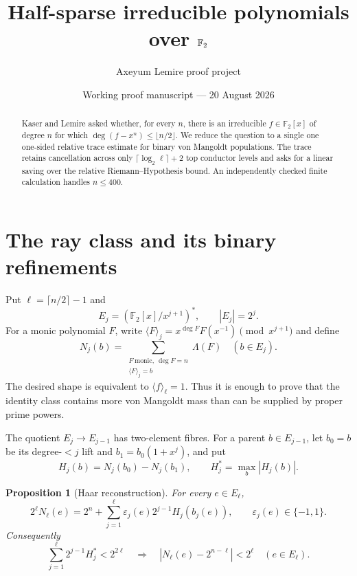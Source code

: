 \documentclass[10pt]{article}
\title{Half-sparse irreducible polynomials over $\F_2$}
\author{Axeyum Lemire proof project}
\date{Working proof manuscript --- 20 August 2026}
\newtheorem{proposition}[theorem]{Proposition}
\newcommand{\F}{\mathbb F}
\begin{document}
\maketitle
\vspace{-1.2em}
\begin{center}
\end{center}

\begin{abstract}
Kaser and Lemire asked whether, for every $n$, there is an irreducible
$f\in\F_2[x]$ of degree $n$ for which
$\deg(f-x^n)\leq\lfloor n/2\rfloor$.  We reduce the question to a single
one one-sided relative trace estimate for binary von Mangoldt populations.
The trace retains cancellation across only $\lceil\log_2\ell\rceil+2$ top
conductor levels and asks for a linear saving over the relative
Riemann--Hypothesis bound.  An independently checked finite calculation
handles $n\leq400$.
\end{abstract}

\section{The ray class and its binary refinements}

Put $\ell=\lceil n/2\rceil-1$ and
\[
 E_j=(\F_2[x]/x^{j+1})^*,\qquad |E_j|=2^j.
\]
For a monic polynomial $F$, write
$\langle F\rangle_j=x^{\deg F}F(x^{-1})\pmod{x^{j+1}}$ and define
\[
 N_j(b)=\sum_{\substack{F\ \mathrm{monic},\ \deg F=n\\
                         \langle F\rangle_j=b}}\Lambda(F)
 \quad(b\in E_j).
\]
The desired shape is equivalent to $\langle f\rangle_\ell=1$.  Thus it is
enough to prove that the identity class contains more von Mangoldt mass than
can be supplied by proper prime powers.

The quotient $E_j\to E_{j-1}$ has two-element fibres.  For a parent
$b\in E_{j-1}$, let $b_0=b$ be its degree-$<j$ lift and
$b_1=b_0(1+x^j)$, and put
\[
 H_j(b)=N_j(b_0)-N_j(b_1),\qquad H_j^*=\max_b|H_j(b)|.
\]

\begin{proposition}[Haar reconstruction]\label{prop:haar}
For every $e\in E_\ell$,
\[
 2^\ell N_\ell(e)
 =2^n+\sum_{j=1}^{\ell}\varepsilon_j(e)2^{j-1}H_j(b_j(e)),
 \qquad \varepsilon_j(e)\in\{-1,1\}.
\]
Consequently
\begin{equation}\label{eq:triangle}
 \sum_{j=1}^{\ell}2^{j-1}H_j^*<2^{2\ell}
 \quad\Longrightarrow\quad
 |N_\ell(e)-2^{n-\ell}|<2^\ell\quad(e\in E_\ell).
\end{equation}
\end{proposition}
\end{document}
